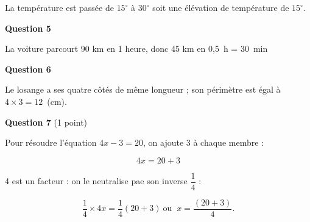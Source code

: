 La température est passée de $15^\circ$ à $30^\circ$ soit une élévation de température de $15^\circ$.

\medskip

\textbf{Question 5}

La voiture parcourt 90 km en 1 heure, donc 45 km en 0,5~h = 30~min
\medskip

\textbf{Question 6}

Le losange a ses quatre côtés de même longueur ; son périmètre est égal à $4 \times 3 = 12$~(cm).

\medskip

\textbf{Question 7} (1 point)

%
Pour résoudre l'équation $4x - 3 = 20$, on ajoute 3 à chaque membre :

\[4x = 20 + 3\]

4 est un facteur : on le neutralise pae son inverse $\dfrac14$ :

\[\dfrac14 \times 4x = \dfrac14\left(20 + 3\right) \:\text{ou } \: x  = \dfrac{(20 + 3)}{4}.\]

